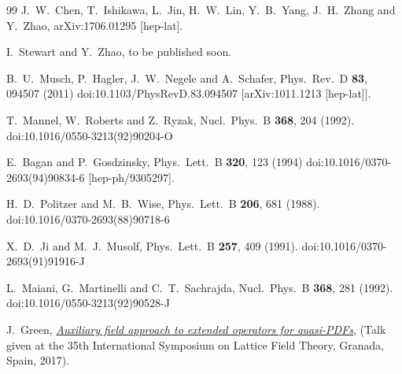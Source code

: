 \documentclass[prd,aps,twocolumn,preprintnumbers, showpacs, nofootinbib,superscriptaddress,notitlepage]{revtex4-1}
\begin{document}
\begin{thebibliography}{99}
J.~W.~Chen, T.~Ishikawa, L.~Jin, H.~W.~Lin, Y.~B.~Yang, J.~H.~Zhang and Y.~Zhao,
arXiv:1706.01295 [hep-lat].


	I.~Stewart and Y.~Zhao,
	to be published soon.


  B.~U.~Musch, P.~Hagler, J.~W.~Negele and A.~Schafer,
  Phys.\ Rev.\ D {\bf 83}, 094507 (2011)
  doi:10.1103/PhysRevD.83.094507
  [arXiv:1011.1213 [hep-lat]].



  T.~Mannel, W.~Roberts and Z.~Ryzak,
  Nucl.\ Phys.\ B {\bf 368}, 204 (1992).
  doi:10.1016/0550-3213(92)90204-O


  E.~Bagan and P.~Gosdzinsky,
  Phys.\ Lett.\ B {\bf 320}, 123 (1994)
  doi:10.1016/0370-2693(94)90834-6
  [hep-ph/9305297].

  H.~D.~Politzer and M.~B.~Wise,
  Phys.\ Lett.\ B {\bf 206}, 681 (1988).
  doi:10.1016/0370-2693(88)90718-6



  X.~D.~Ji and M.~J.~Musolf,
  Phys.\ Lett.\ B {\bf 257}, 409 (1991).
  doi:10.1016/0370-2693(91)91916-J


  L.~Maiani, G.~Martinelli and C.~T.~Sachrajda,
  Nucl.\ Phys.\ B {\bf 368}, 281 (1992).
  doi:10.1016/0550-3213(92)90528-J


  J.~Green,
  {\href{https://makondo.ugr.es/event/0/session/95/contribution/332/material/slides/0.pdf}{\it Auxiliary field approach to extended operators for quasi-PDFs}},
  (Talk given at the 35th International Symposium on Lattice Field Theory, Granada, Spain, 2017).


\end{thebibliography}
\end{document}
